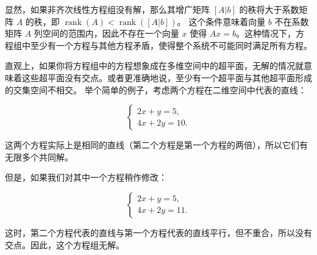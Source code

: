 显然，如果非齐次线性方程组没有解，那么其增广矩阵 $[A|b]$ 的秩将大于系数矩阵 $A$ 的秩，即 $\operatorname{rank}(A) < \operatorname{\operatorname{rank}}([A|b])$。
这个条件意味着向量 $b$ 不在系数矩阵 $A$ 列空间的范围内，因此不存在一个向量 $x$ 使得 $Ax = b$。这种情况下，方程组中至少有一个方程与其他方程矛盾，使得整个系统不可能同时满足所有方程。

直观上，如果你将方程组中的方程想象成在多维空间中的超平面，无解的情况就意味着这些超平面没有交点。或者更准确地说，至少有一个超平面与其他超平面形成的交集空间不相交。
举个简单的例子，考虑两个方程在二维空间中代表的直线：

$$
\left\{\begin{array}{c}
2x + y = 5, \\
4x + 2y = 10 .
\end{array}\right.
$$

这两个方程实际上是相同的直线（第二个方程是第一个方程的两倍），所以它们有无限多个共同解。

但是，如果我们对其中一个方程稍作修改：

$$
\left\{\begin{array}{c}
2x + y = 5, \\
4x + 2y = 11 .
\end{array}\right.
$$

这时，第二个方程代表的直线与第一个方程代表的直线平行，但不重合，所以没有交点。因此，这个方程组无解。






